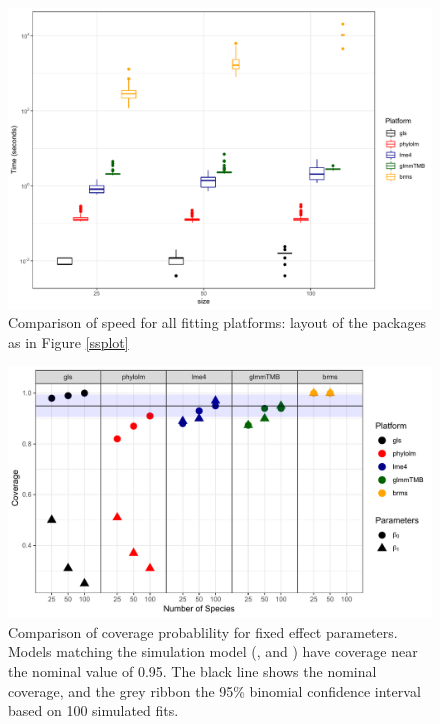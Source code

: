 \documentclass[12pt]{article}
\begin{document}
\begin{center}
\begin{figure}[H]
  \includegraphics[scale=0.7]{./figure/sstime.pdf}
  \caption{Comparison of speed for all fitting platforms: layout of the packages as in Figure \ref{ssplot}}
\label{ssplot_speed}
\end{figure}
\end{center}


\begin{center}
\begin{figure}[H]
  \includegraphics[scale=0.7]{./figure/sscoverage.pdf}
  \caption{Comparison of coverage probablility for fixed effect parameters. Models matching the simulation model (,  and ) have coverage near the nominal value of 0.95. The black line shows the nominal coverage, and the grey ribbon the 95\% binomial confidence interval based on 100 simulated fits. 
  }
\label{ssplot_coverage}
\end{figure}
\end{center}
\end{document}

